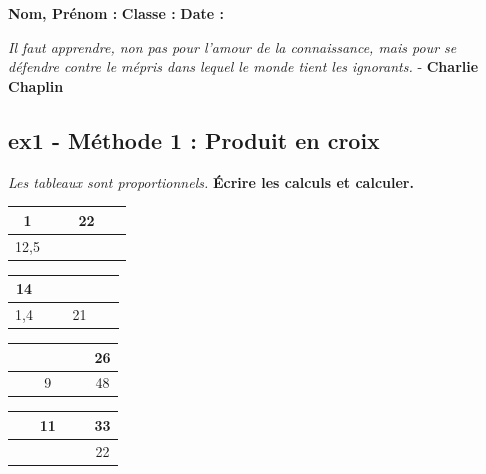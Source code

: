 \newpage


\textbf{Nom, Prénom :} \hspace{8cm} \textbf{Classe :} \hspace{3cm} \textbf{Date :}\\

\begin{center}
  \textit{Il faut apprendre, non pas pour l'amour de la connaissance, mais pour se défendre contre le mépris dans lequel le monde tient les ignorants.}  - \textbf{Charlie Chaplin}
\end{center}

\subsection*{ex1 - Méthode 1 : Produit en croix}
\textit{Les tableaux sont proportionnels.} \newline
\textbf{Écrire les calculs et calculer.}

\begin{multicols}{4}\noindent
  \begin{center}
    \begin{tabular}{|c|c|}
      \hline
      1 & 22\\  \hline
      12,5 & $\phantom{azertyuiop}$\\  \hline
    \end{tabular}
  \end{center}
  \Pointilles[1]
  \begin{center}
    \begin{tabular}{|c|c|}
      \hline
      14 & $\phantom{azertyuiop}$\\  \hline
      1,4 & 21\\  \hline
    \end{tabular}
  \end{center}
  \Pointilles[1]
  \begin{center}
    \begin{tabular}{|c|c|}
      \hline
      $\phantom{azertyuiop}$  & 26\\  \hline
      9 & 48\\  \hline
    \end{tabular}
  \end{center}
  \Pointilles[1]
  \begin{center}
    \begin{tabular}{|c|c|}
      \hline
      11 & 33\\  \hline
      $\phantom{azertyuiop}$ & 22\\  \hline
    \end{tabular}
  \end{center}
  \Pointilles[1]
\end{multicols}

